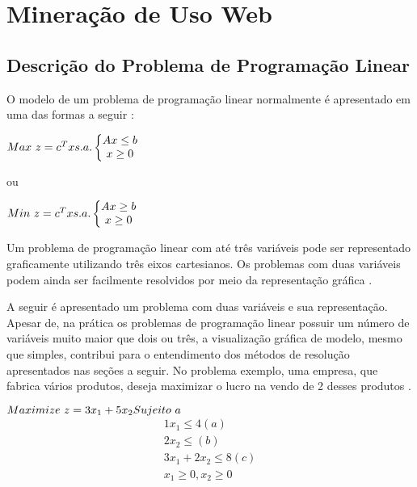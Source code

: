\chapter{Mineração de Uso Web}


\section{Descrição do Problema de Programação Linear}
O modelo de um problema de programação linear normalmente é apresentado em uma das formas a seguir \cite{Passos}:

$\\Max\ z = c^{T}x \\\\s.a.\left\{\begin{matrix}
Ax\leq b\\x\geq 0
\end{matrix}\right.$

ou

$\\Min\ z = c^{T}x \\\\s.a.\left\{\begin{matrix}
Ax\geq  b\\x\geq 0
\end{matrix}\right.$

Um problema de programação linear com até três variáveis pode ser representado graficamente utilizando três eixos cartesianos. Os problemas com duas variáveis podem ainda ser facilmente resolvidos por meio da representação gráfica \cite{Passos}.

A seguir é apresentado um problema com duas variáveis e sua representação. Apesar de, na prática os problemas de programação linear possuir um número de variáveis muito maior que dois ou três, a visualização gráfica de modelo, mesmo que simples, contribui para o entendimento dos métodos de resolução apresentados nas seções a seguir.
No problema exemplo, uma empresa, que fabrica vários produtos, deseja maximizar o lucro na vendo de 2 desses produtos \cite{Hillier}.

$\\Maximize\ z=3x_{1}+5x_{2}\\
Sujeito\ a\\$
\begin{eqnarray*}
        1x_{1}\leq 4 (a)\\
              2x_{2}\leq (b)\\
        3x_{1}+2x_{2}\leq 8 (c)\\
         x_{1}\geq 0, x_{2}\geq 0
\end{eqnarray*}


